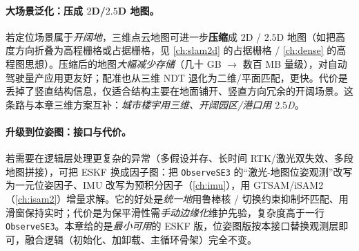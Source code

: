 \paragraph{大场景泛化：压成 $2$D/$2.5$D 地图。}
若定位场景属于\emph{开阔地}，三维点云地图可进一步\textbf{压缩}成 $2$D / $2.5$D 地图（如把高度方向折叠为高程栅格或占据栅格，见 \cref{ch:slam2d} 的占据栅格 / \cref{ch:dense} 的高程图思想）。压缩后的地图\emph{大幅减少存储}（几十 GB $\to$ 数百 MB 量级），对自动驾驶量产应用更友好；配准也从三维 NDT 退化为二维/平面匹配，更快。代价是丢掉了竖直结构信息，仅适合结构主要在地面铺开、竖直方向冗余的开阔场景。这条路与本章三维方案互补：\emph{城市楼宇用三维、开阔园区/港口用 $2.5$D}。

\paragraph{升级到位姿图：接口与代价。}
若需要在逻辑层处理更复杂的异常（多假设并存、长时间 RTK/激光双失效、多段地图拼接），可把 ESKF 换成因子图：把 \texttt{ObserveSE3} 的“激光-地图位姿观测”改写为一元位姿因子、IMU 改写为预积分因子（\cref{ch:imu}），用 GTSAM/iSAM2（\cref{ch:isam2}）增量求解。它的好处是\emph{统一地}用鲁棒核 / 切换约束抑制坏匹配、用滑窗保持实时；代价是为保平滑性需\emph{手动边缘化}维护先验，复杂度高于一行 \texttt{ObserveSE3}。本章给的是\emph{最小可用}的 ESKF 版，位姿图版按本接口替换观测层即可，融合逻辑（初始化、加卸载、主循环骨架）完全不变。


